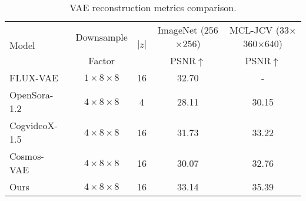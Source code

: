\begin{table*}[ht]
\renewcommand{\arraystretch}{1.2}
\small
\centering  
\caption{VAE reconstruction metrics comparison.}
\begin{tabular}{lcccc}
\toprule
\multirow{2}{*}{Model} & Downsample  & \multirow{2}{*}{$|z|$} & ImageNet (256$\times$256)
& MCL-JCV (33$\times$360$\times$640) \\
& Factor & & PSNR$\uparrow$ & PSNR$\uparrow$ \\
\midrule
FLUX-VAE~\cite{FLUX}                   & $1 \times 8 \times 8$ & 16 & 32.70 & - \\
\midrule
OpenSora-1.2~\cite{opensora}           & $4 \times 8 \times 8$ & 4  & 28.11 & 30.15 \\
CogvideoX-1.5~\cite{yang2024cogvideox} & $4 \times 8 \times 8$ & 16 & 31.73 & 33.22 \\
Cosmos-VAE~\cite{cosmos}               & $4 \times 8 \times 8$ & 16 & 30.07 & 32.76 \\
Ours                                   & $4 \times 8 \times 8$ & 16 & 33.14 & 35.39 \\
\bottomrule
\end{tabular}
\label{tab:sota_vae}
\end{table*}
